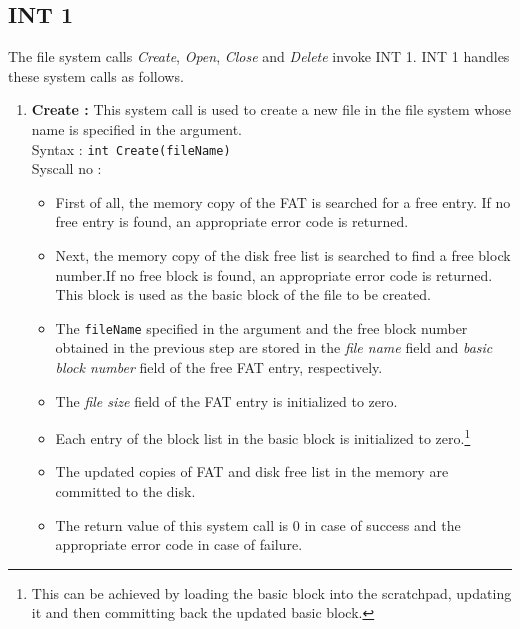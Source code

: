 \subsection{INT 1}
The file system calls \textit{Create}, \textit{Open}, \textit{Close} and \textit{Delete} invoke INT 1. INT 1 handles these system calls as follows.
\begin{enumerate}
	\item  \textbf{Create :} This system call is used to create a new file in the file system whose name is specified in the argument.\\
	Syntax : \texttt{int Create(fileName)} \\
	Syscall no : 
	\begin{itemize}
		\item First of all, the memory copy of the FAT  is searched for a free entry. If no free entry is found, an appropriate error code is returned.
		
		\item Next, the memory copy of the disk free list  is searched to find a free block number.If no free block is found, an appropriate error code is returned. This block is used as the basic block of the file to be created.
		
		\item The \texttt{fileName} specified in the argument and the free block number obtained in the previous step are stored in the \emph{file name} field and \emph{basic block number} field of the free FAT entry, respectively.
				
		\item The \emph{file size} field of the FAT entry is initialized to zero.
		
		\item Each entry of the block list in the basic block is initialized to zero.\footnote{This can be achieved by loading the basic block into the scratchpad, updating it and then committing back the updated basic block.}
		
		\item The updated copies of FAT  and disk free list 
		 in the memory are committed to the disk.
		
		\item The return value of this system call is 0 in case of success and the appropriate error code in case of failure.
	\end{itemize}


\end{enumerate}
